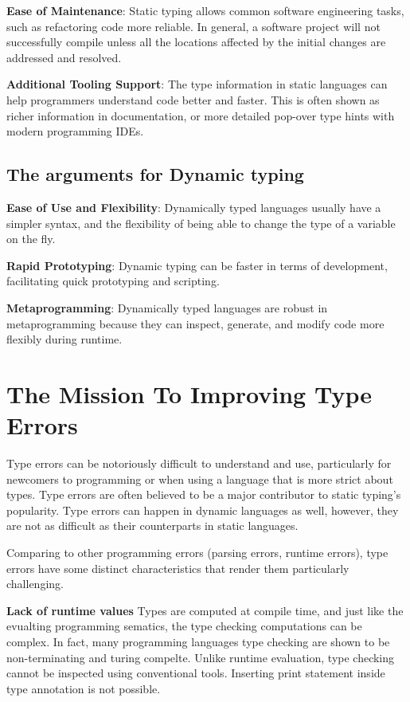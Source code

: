 \textbf{Ease of Maintenance}: Static typing allows common software engineering tasks, such as refactoring code more reliable. In general, a software project will not successfully compile unless all the  locations affected by the initial changes are addressed and resolved.

\textbf{Additional Tooling Support}: The type information in static languages can help programmers understand code better and faster. This is often shown as richer information in documentation, or more detailed pop-over type hints with modern programming IDEs.  

\subsection{The arguments for Dynamic typing}

\textbf{Ease of Use and Flexibility}: Dynamically typed languages usually have a simpler syntax, and the flexibility of being able to change the type of a variable on the fly.

\textbf{Rapid Prototyping}: Dynamic typing can be faster in terms of development, facilitating quick prototyping and scripting.

\textbf{Metaprogramming}: Dynamically typed languages are robust in metaprogramming because they can inspect, generate, and modify code more flexibly during runtime.


\section{The Mission To Improving Type Errors}


Type errors can be notoriously difficult to understand and use, particularly for newcomers to programming or when using a language that is more strict about types. Type errors are often believed to be a major contributor to static typing's popularity. Type errors can happen in dynamic languages as well, however, they are not as difficult as their counterparts in static languages.

Comparing to other programming errors (parsing errors, runtime errors), type errors have some distinct characteristics that render them particularly challenging. 

\textbf{Lack of runtime values}
Types are computed at compile time, and just like the evualting programming sematics, the type checking computations can be complex. In fact, many programming languages type checking are shown to be non-terminating and turing compelte.  Unlike runtime evaluation, type checking cannot be inspected using conventional tools. Inserting print statement inside type annotation is not possible. 

